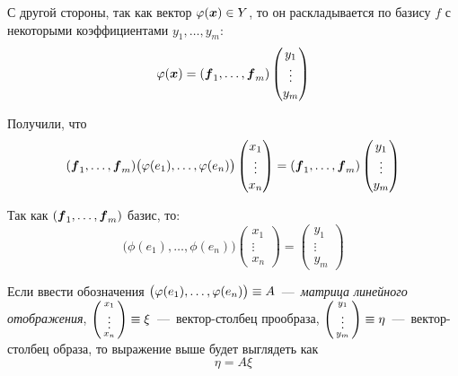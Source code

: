 \documentclass[a4paper,12pt]{article}
\begin{document}
  С другой стороны, так как вектор $\phi(\bds x) \hm\in Y$, то он раскладывается по базису $f$ с некоторыми коэффициентами $y_1, \ldots, y_m$:
  \[
    \varphi(\boldsymbol x) = (\boldsymbol f_1, \ldots, \boldsymbol f_m) \begin{pmatrix}
      y_1 \\ \vdots \\ y_m
    \end{pmatrix}
  \]
  
  Получили, что
  \[
    (\boldsymbol f_1, \ldots, \boldsymbol f_m) \bigl(\varphi(e_1), \ldots, \varphi(e_n)\bigr) \begin{pmatrix}
      x_1 \\ \vdots \\ x_n
    \end{pmatrix}
    = (\boldsymbol f_1, \ldots, \boldsymbol f_m) \begin{pmatrix}
      y_1 \\ \vdots \\ y_m
    \end{pmatrix}
  \]
  
  Так как $(\boldsymbol f_1, \ldots, \boldsymbol f_m)$ базис, то:
  \[
    \bigl(\phi(e_1), \ldots, \phi(e_n)\bigr) \begin{pmatrix}
      x_1 \\ \vdots \\ x_n
    \end{pmatrix} = \begin{pmatrix}
      y_1 \\ \vdots \\ y_m
    \end{pmatrix}
  \]
  
  Если ввести обозначения $\bigl(\phi(e_1), \ldots, \phi(e_n)\bigr) \hm\equiv A$~---~\emph{матрица линейного отображения},
  $\left(\begin{smallmatrix}x_1 \\ \vdots \\ x_n\end{smallmatrix}\right) \hm\equiv \xi$~---~вектор-столбец прообраза,
  $\left(\begin{smallmatrix}y_1 \\ \vdots \\ y_m\end{smallmatrix}\right) \hm\equiv \eta$~---~вектор-столбец образа,
  то выражение выше будет выглядеть как
  \[
    \boxed{\eta = A \xi}
  \]
  
\end{document}
